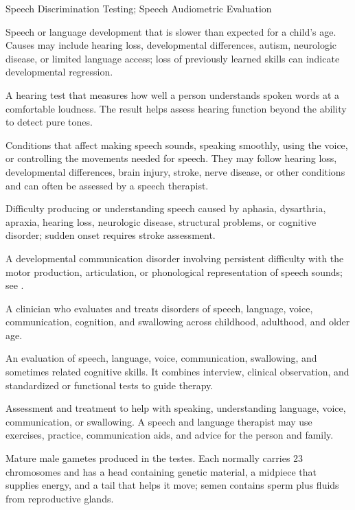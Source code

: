 \synonyms
Speech Discrimination Testing; Speech Audiometric Evaluation

 Speech or language development that is slower than expected for a child's age. Causes may include hearing loss, developmental differences, autism, neurologic disease, or limited language access; loss of previously learned skills can indicate developmental regression.

 A hearing test that measures how well a person understands spoken words at a comfortable loudness. The result helps assess hearing function beyond the ability to detect pure tones.

 Conditions that affect making speech sounds, speaking smoothly, using the voice, or controlling the movements needed for speech. They may follow hearing loss, developmental differences, brain injury, stroke, nerve disease, or other conditions and can often be assessed by a speech therapist.

 Difficulty producing or understanding speech caused by aphasia, dysarthria, apraxia, hearing loss, neurologic disease, structural problems, or cognitive disorder; sudden onset requires stroke assessment.

 A developmental communication disorder involving persistent difficulty with the motor production, articulation, or phonological representation of speech sounds; see .

 A clinician who evaluates and treats disorders of speech, language, voice, communication, cognition, and swallowing across childhood, adulthood, and older age.

 An evaluation of speech, language, voice, communication, swallowing, and sometimes related cognitive skills. It combines interview, clinical observation, and standardized or functional tests to guide therapy.

 Assessment and treatment to help with speaking, understanding language, voice, communication, or swallowing. A speech and language therapist may use exercises, practice, communication aids, and advice for the person and family.

 Mature male gametes produced in the testes. Each normally carries 23 chromosomes and has a head containing genetic material, a midpiece that supplies energy, and a tail that helps it move; semen contains sperm plus fluids from reproductive glands.

